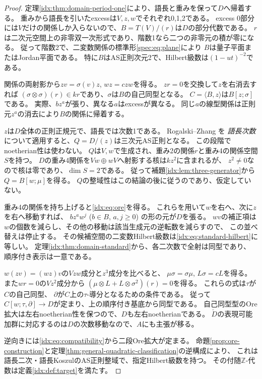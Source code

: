 \documentclass[11pt,a4paper]{ltjsarticle}
\theoremstyle{definition}
\begin{document}
\begin{proof}
定理\ref{idx:thm:domain-period-one}により、語長と重みを保って$D$へ帰着する。
重みから語長を引いたexcessは$V,z,w$でそれぞれ0,1,2である。
excess 0部分には$V$だけの関係しか入らないので、$B=T(V)/(r)$は$D$の部分代数である。
$r$は二次元空間上の非零双一次形式であり、階数1なら二つの非零元の積が零になる。
従って階数2で、二変数関係の標準形\eqref{spec:eq:plane}により
$B$は量子平面またはJordan平面である。
特に$B$はAS正則次元2で、Hilbert級数は$(1-ut)^{-2}$である。

関係の両射影から$zv=\sigma(v)z$, $wz=czw$を得る。
$zr=0$を交換して$z$を右消去すれば
$(\sigma\otimes\sigma)(r)\in kr$であり、$\sigma$は$B$の自己同型となる。
$C=\langle B,z\rangle$は$B[z;\sigma]$である。
実際、$bz^a$が張り、異なる$a$はexcessが異なる。
同じ$a$の線型関係は正則元$z^a$の消去により$B$の関係に帰着する。

$z$は$D$全体の正則正規元で、語長では次数1である。
Rogalski--Zhang \cite[Lemma 1.1, Corollary 1.2]{RZ}を
\emph{語長次数}について適用すると、$Q=D/(z)$は三次元AS正則となる。
この段階でnoetherian性は使わない。
$Q$は$V,w$で生成され、重み2の関係$r$と重み4の関係空間$S$を持つ。
$D$の重み4関係を$Vw\oplus wV$へ射影する核は$kz^2$に含まれるが、
$z^2\ne0$なので核は零であり、$\dim S=2$である。
従って補題\ref{idx:lem:three-generator}から$Q=B[w;\mu]$を得る。
$Q$の整域性はこの結論の後に従うのであり、仮定していない。

重み4の関係を持ち上げると\eqref{idx:eq:ore}を得る。
これらを用いて$w$を右へ、次に$z$を右へ移動すれば、
$bz^aw^j$ ($b\in B$, $a,j\ge0$) の形の元が$D$を張る。
$wv$の補正項は$w$の個数を減らし、その他の移動は該当生成元の逆転数を減らすので、
この並べ替えは停止する。
その候補空間の二変数Hilbert級数は\eqref{idx:eq:standard-hilbert}に等しい。
定理\ref{idx:thm:domain-standard}から、各二次数で全射は同型であり、
順序付き表示は一意である。

$w(zv)=(wz)v$の$Vzw$成分と$z^3$成分を比べると、
$\mu\sigma=\sigma\mu$, $L\sigma=cL$を得る。
また$wr=0$の$Vz^2$成分から
$(\mu\otimes L+L\otimes\sigma^2)(r)=0$を得る。
これらの式は$\tau$が$C$の自己同型、
$\partial$が$C$上の$\tau$-導分となるための条件である。
従って$C[w;\tau,\partial]\to D$が定まり、上の順序付き基底から同型である。
自己同型型のOre拡大は左右noetherian性を保つので、$D$も左右noetherianである。
$\check D$の表現可能加群に対応するのは$D$の次数移動なので、$A$にも主張が移る。

逆向きには\eqref{idx:eq:compatibility}から二段Ore拡大が定まる。
命題\ref{prop:ore-construction}と定理\ref{thm:general-quadratic-classification}の逆構成により、
これは語長二次・語長KoszulのAS正則整域で、指定Hilbert級数を持つ。
その付随$\mathbb Z$-代数は定義\ref{idx:def:target}を満たす。
\end{proof}
\end{document}

